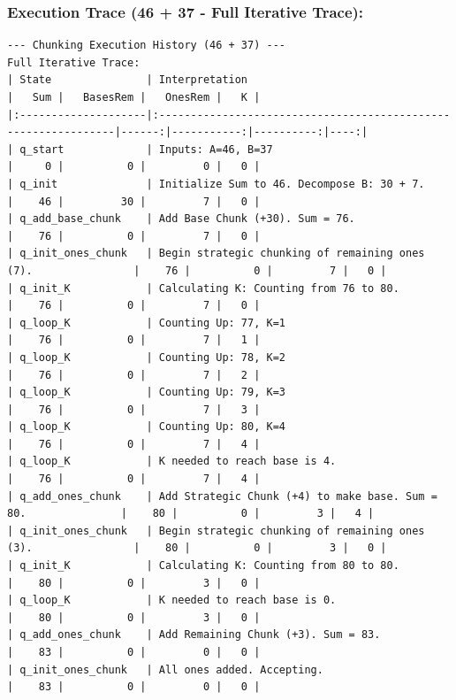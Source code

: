\documentclass[11pt]{article}
\begin{document}
\subsubsection*{Execution Trace (46 + 37 - Full Iterative Trace):}
\begin{verbatim}
--- Chunking Execution History (46 + 37) ---
Full Iterative Trace:
| State               | Interpretation                                                 |   Sum |   BasesRem |   OnesRem |   K |
|:--------------------|:---------------------------------------------------------------|------:|-----------:|----------:|----:|
| q_start             | Inputs: A=46, B=37                                             |     0 |          0 |         0 |   0 |
| q_init              | Initialize Sum to 46. Decompose B: 30 + 7.                     |    46 |         30 |         7 |   0 |
| q_add_base_chunk    | Add Base Chunk (+30). Sum = 76.                                |    76 |          0 |         7 |   0 |
| q_init_ones_chunk   | Begin strategic chunking of remaining ones (7).                |    76 |          0 |         7 |   0 |
| q_init_K            | Calculating K: Counting from 76 to 80.                         |    76 |          0 |         7 |   0 |
| q_loop_K            | Counting Up: 77, K=1                                           |    76 |          0 |         7 |   1 |
| q_loop_K            | Counting Up: 78, K=2                                           |    76 |          0 |         7 |   2 |
| q_loop_K            | Counting Up: 79, K=3                                           |    76 |          0 |         7 |   3 |
| q_loop_K            | Counting Up: 80, K=4                                           |    76 |          0 |         7 |   4 |
| q_loop_K            | K needed to reach base is 4.                                   |    76 |          0 |         7 |   4 |
| q_add_ones_chunk    | Add Strategic Chunk (+4) to make base. Sum = 80.               |    80 |          0 |         3 |   4 |
| q_init_ones_chunk   | Begin strategic chunking of remaining ones (3).                |    80 |          0 |         3 |   0 |
| q_init_K            | Calculating K: Counting from 80 to 80.                         |    80 |          0 |         3 |   0 |
| q_loop_K            | K needed to reach base is 0.                                   |    80 |          0 |         3 |   0 |
| q_add_ones_chunk    | Add Remaining Chunk (+3). Sum = 83.                            |    83 |          0 |         0 |   0 |
| q_init_ones_chunk   | All ones added. Accepting.                                     |    83 |          0 |         0 |   0 |
\end{verbatim}

\printbibliography
\end{document}
